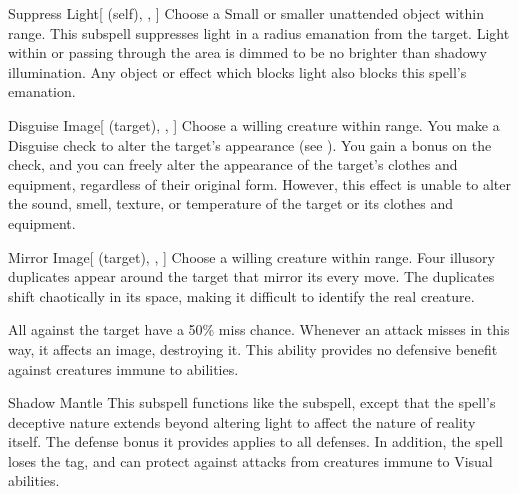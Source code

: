 \begin{ability}[\nth{1}]{Suppress Light}[ (self), , ]
Choose a Small or smaller unattended object within \rngclose range.
This subspell suppresses light in a \areamed radius emanation from the target.
Light within or passing through the area is dimmed to be no brighter than shadowy illumination.
Any object or effect which blocks light also blocks this spell's emanation.
\end{ability}
\vspace{0.25em}


\begin{ability}[\nth{2}]{Disguise Image}[ (target), , ]
Choose a willing creature within \rngclose range.
You make a Disguise check to alter the target's appearance (see ).
You gain a  bonus on the check, and you can freely alter the appearance of the target's clothes and equipment, regardless of their original form.
However, this effect is unable to alter the sound, smell, texture, or temperature of the target or its clothes and equipment.
\end{ability}
\vspace{0.25em}


\begin{ability}[\nth{2}]{Mirror Image}[ (target), , ]
Choose a willing creature within \rngclose range.
Four illusory duplicates appear around the target that mirror its every move.
The duplicates shift chaotically in its space, making it difficult to identify the real creature.

All   against the target have a 50\% miss chance.
Whenever an attack misses in this way, it affects an image, destroying it.
This ability provides no defensive benefit against creatures immune to  abilities.
\end{ability}
\vspace{0.25em}


\begin{ability}[\nth{3}]{Shadow Mantle}
This subspell functions like the  subspell, except that the spell's deceptive nature extends beyond altering light to affect the nature of reality itself.
The defense bonus it provides applies to all defenses.
In addition, the spell loses the  tag, and can protect against attacks from creatures immune to Visual abilities.
\end{ability}
\vspace{0.25em}


